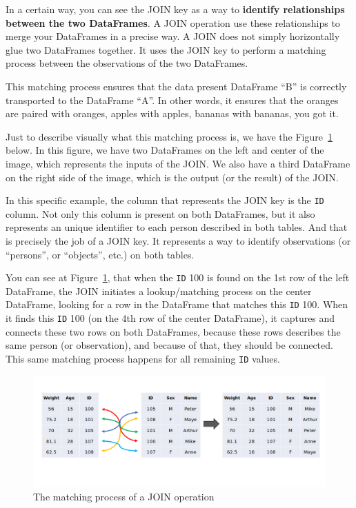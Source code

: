 \documentclass[
  11pt,
  letterpaper,
  DIV=11,
  numbers=noendperiod]{scrreprt}
\begin{document}
In a certain way, you can see the JOIN key as a way to \textbf{identify
relationships between the two DataFrames}. A JOIN operation use these
relationships to merge your DataFrames in a precise way. A JOIN does not
simply horizontally glue two DataFrames together. It uses the JOIN key
to perform a matching process between the observations of the two
DataFrames.

This matching process ensures that the data present DataFrame ``B'' is
correctly transported to the DataFrame ``A''. In other words, it ensures
that the oranges are paired with oranges, apples with apples, bananas
with bananas, you got it.

Just to describe visually what this matching process is, we have the
Figure~\ref{fig-join-matching} below. In this figure, we have two
DataFrames on the left and center of the image, which represents the
inputs of the JOIN. We also have a third DataFrame on the right side of
the image, which is the output (or the result) of the JOIN.

In this specific example, the column that represents the JOIN key is the
\texttt{ID} column. Not only this column is present on both DataFrames,
but it also represents an unique identifier to each person described in
both tables. And that is precisely the job of a JOIN key. It represents
a way to identify observations (or ``persons'', or ``objects'', etc.) on
both tables.

You can see at Figure~\ref{fig-join-matching}, that when the \texttt{ID}
100 is found on the 1st row of the left DataFrame, the JOIN initiates a
lookup/matching process on the center DataFrame, looking for a row in
the DataFrame that matches this \texttt{ID} 100. When it finds this
\texttt{ID} 100 (on the 4th row of the center DataFrame), it captures
and connects these two rows on both DataFrames, because these rows
describes the same person (or observation), and because of that, they
should be connected. This same matching process happens for all
remaining \texttt{ID} values.

\begin{figure}

{\centering \includegraphics{Chapters/./../Figures/pareamento1.png}

}

\caption{\label{fig-join-matching}The matching process of a JOIN
operation}

\end{figure}
\end{document}
